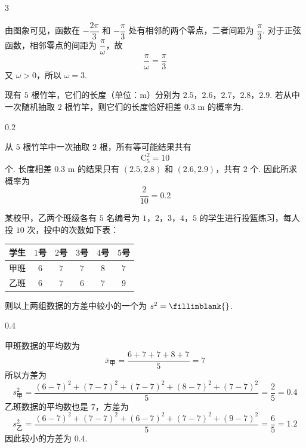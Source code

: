 \begin{answer}
\(3\)
\end{answer}

\begin{solution}
由图象可见，函数在 \(-\dfrac{2\pi}{3}\) 和 \(-\dfrac{\pi}{3}\) 处有相邻的两个零点，二者间距为 \(\dfrac{\pi}{3}\). 对于正弦函数，相邻零点的间距为 \(\dfrac{\pi}{\omega}\)，故
\[
\frac{\pi}{\omega}=\frac{\pi}{3}
\]
又 \(\omega>0\)，所以 \(\omega=3\).
\end{solution}

\begin{problem}
现有 \(5\) 根竹竿，它们的长度（单位：\(\text{m}\)）分别为 \(2.5\)，\(2.6\)，\(2.7\)，\(2.8\)，\(2.9\). 若从中一次随机抽取 \(2\) 根竹竿，则它们的长度恰好相差 \(0.3\text{ m}\) 的概率为\fillinblank{}.
\end{problem}

\begin{answer}
\(0.2\)
\end{answer}

\begin{solution}
从 \(5\) 根竹竿中一次抽取 \(2\) 根，所有等可能结果共有
\[
\mathrm C_5^2=10
\]
个. 长度相差 \(0.3\text{ m}\) 的结果只有 \((2.5,2.8)\) 和 \((2.6,2.9)\)，共有 \(2\) 个. 因此所求概率为
\[
\frac{2}{10}=0.2
\]
\end{solution}

\begin{problem}
某校甲，乙两个班级各有 \(5\) 名编号为 \(1\)，\(2\)，\(3\)，\(4\)，\(5\) 的学生进行投篮练习，每人投 \(10\) 次，投中的次数如下表：

\begin{center}
\begin{tabular}{c|ccccc}
学生 & \(1\)号 & \(2\)号 & \(3\)号 & \(4\)号 & \(5\)号 \\
\hline
甲班 & \(6\) & \(7\) & \(7\) & \(8\) & \(7\) \\
乙班 & \(6\) & \(7\) & \(6\) & \(7\) & \(9\)
\end{tabular}
\end{center}

则以上两组数据的方差中较小的一个为 \(s^2=\fillinblank{}\).
\end{problem}

\begin{answer}
\(0.4\)
\end{answer}

\begin{solution}
甲班数据的平均数为
\[
\bar{x}_{\text{甲}}=\frac{6+7+7+8+7}{5}=7
\]
所以方差为
\[
s_{\text{甲}}^2=\frac{(6-7)^2+(7-7)^2+(7-7)^2+(8-7)^2+(7-7)^2}{5}=\frac25=0.4
\]
乙班数据的平均数也是 \(7\)，方差为
\[
s_{\text{乙}}^2=\frac{(6-7)^2+(7-7)^2+(6-7)^2+(7-7)^2+(9-7)^2}{5}=\frac65=1.2
\]
因此较小的方差为 \(0.4\).
\end{solution}


